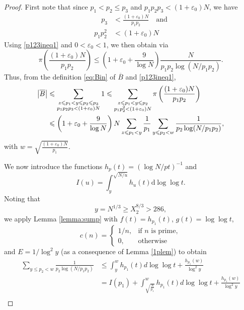 \documentclass[12pt]{amsart}
\begin{document}
\begin{proof}
First note that since $p_1 < p_2 \le p_3$ and $p_1p_2p_3<(1+\varepsilon_0)N$, we have 
\begin{align}\label{p123ineq1}
\quad p_3 &< \frac{(1+\varepsilon_0)N}{p_1p_2} \quad\text{and}\\
p_1p_2^2&<(1+\varepsilon_0)N\label{p123ineq2}
\end{align}
Using \eqref{p123ineq1} and $0<\varepsilon_0<1$, we then obtain via \cite[Theorem 1]{R-S}
\begin{equation*}
\pi \left (\frac{(1+\varepsilon_0)N}{p_1 p_2} \right)\le \left(1+\varepsilon_0+\frac{9}{\log N}\right)\frac{N}{p_1 p_2 \log (N/p_1p_2)}.
\end{equation*}
Thus, from the definition \eqref{eq:Bin} of $\overline{B}$ and \eqref{p123ineq1},
\begin{align}
\left| \overline{B}\right| &\le\sum_{\substack{z \le p_1<y \le p_2 \le p_3 \\ p_1p_2p_3 <(1+\varepsilon_0)N}} 1 \le \sum_{\substack{z \le p_1<y \le p_2  \\ p_1p_2^2 <(1+\varepsilon_0)N}} \pi \left (\frac{(1+\varepsilon_0)N}{p_1 p_2} \right) \notag \\ & \le \left(1+\varepsilon_0+\frac{9}{\log N}\right)N\sum_{z \le p_1 <y}\frac{1}{p_1}\sum_{y\le p_2<w}\frac{1}{ p_2 \log (N/p_1p_2)},\label{overBfirstbound}
\end{align}
with $w=\sqrt{\frac{(1+\varepsilon_0)N}{p_1}}$. \par
We now introduce the functions $h_p(t)=\left(\log N/pt\right)^{-1}$ and
\begin{equation*}
I(u)=\int_y^{\sqrt{N/u}} h_u(t)\mathrm{d}\log\log t.
\end{equation*}
Noting that
\begin{equation*}
    y=N^{1/3}\ge X_2^{8/3}> 286,
\end{equation*}
we apply Lemma \ref{lemma:sump} with $f(t)=h_{p_1}(t)$, $g(t)=\log\log t$, 
\begin{equation*}
    c(n)=
    \begin{cases}
        1/n,&\text{if $n$ is prime},\\
        0,&\text{otherwise}
    \end{cases}
\end{equation*}
and $E=1/\log^2 y$ (as a consequence of Lemma \ref{1plem}) to obtain
\begin{align*}
\sum_{y\le p_2<w}\frac{1}{ p_2 \log (N/p_1p_2)}&\le \int_y^wh_{p_1}(t) d \log \log t+\frac{h_{p_1}(w)}{\log^2 y}\\ &= I(p_1)+\int_{\sqrt{\frac{N}{p_1}}}^wh_{p_1}(t) d \log \log t+ \frac{h_{p_1}(w)}{\log^2 y}\\ &

\end{align*}
\end{proof}
\end{document}
